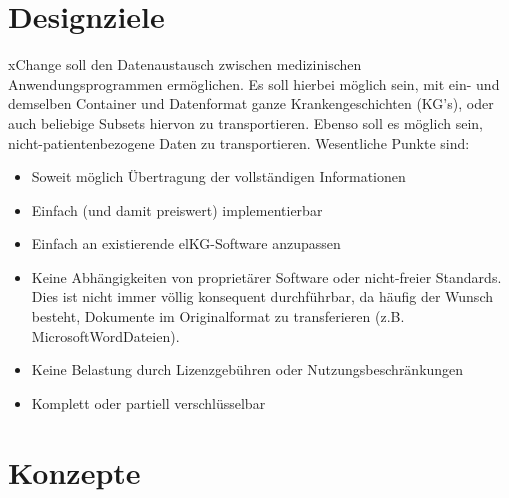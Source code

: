 \documentclass[a4paper]{scrartcl}
\begin{document}
\part{Designziele}
xChange soll den Datenaustausch zwischen medizinischen Anwendungsprogrammen ermöglichen. Es soll hierbei möglich sein, mit ein- und demselben Container und Datenformat ganze Krankengeschichten (KG's), oder auch beliebige Subsets hiervon zu transportieren. Ebenso soll es möglich sein, nicht-patientenbezogene Daten zu transportieren. Wesentliche Punkte sind:

\begin{itemize}
  \item Soweit möglich Übertragung der vollständigen Informationen
  \item Einfach (und damit preiswert) implementierbar
  \item Einfach an existierende elKG-Software anzupassen
  \item Keine Abhängigkeiten von proprietärer Software oder nicht-freier Standards. Dies ist nicht immer völlig konsequent durchführbar, da häufig der Wunsch besteht, Dokumente im Originalformat zu transferieren (z.B. Microsoft\texttrademark Word\texttrademark Dateien).
  \item Keine Belastung durch Lizenzgebühren oder Nutzungsbeschränkungen
  \item Komplett oder partiell verschlüsselbar
\end{itemize}

\part{Konzepte}
\end{document}
